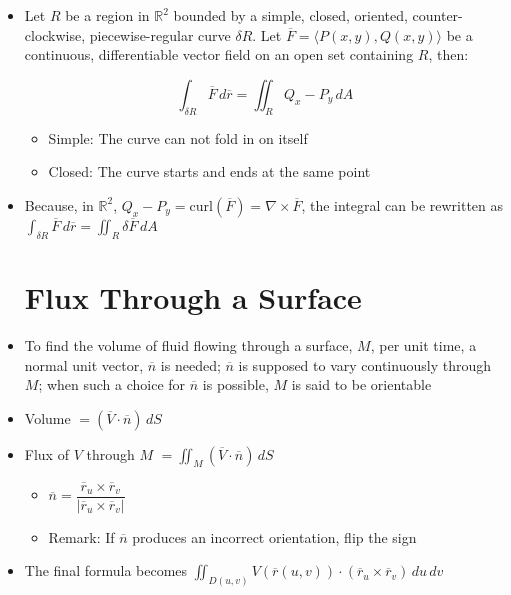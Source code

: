 \begin{itemize}
  \item Let $R$ be a region in $\mathbb{R}^2$ bounded by a simple, closed, oriented, counter-clockwise, piecewise-regular curve $\delta R$. Let $\overline{F}=\langle P(x,y), Q(x,y) \rangle$ be a continuous, differentiable vector field on an open set containing $R$, then:

    $$\int_{\delta R} \overline{F}\,d\overline{r}=\iint_R Q_x-P_y\,dA$$

    \begin{itemize}

      \item Simple: The curve can not fold in on itself

      \item Closed: The curve starts and ends at the same point

    \end{itemize}

  \item Because, in $\mathbb{R}^2$, $Q_x-P_y=\text{curl}(\overline{F})=\nabla \times \overline{F}$, the integral can be rewritten as $\displaystyle \int_{\delta R}\overline{F}\,d\overline{r}=\iint_R\delta\overline{F}\,dA$

    \section{Flux Through a Surface}

  \item To find the volume of fluid flowing through a surface, $M$, per unit time, a normal unit vector, $\overline{n}$ is needed; $\overline{n}$ is supposed to vary continuously through $M$; when such a choice for $\overline{n}$ is possible, $M$ is said to be orientable

  \item Volume $=(\overline{V}\cdot\overline{n})\,dS$

  \item Flux of $V$ through $M$ $=\displaystyle\iint_M (\overline{V}\cdot\overline{n})\,dS$

    \begin{itemize}

      \item $\overline{n}=\dfrac{\overline{r}_u\times\overline{r}_v}{|\overline{r}_u\times\overline{r}_v|}$

      \item Remark: If $\overline{n}$ produces an incorrect orientation, flip the sign

    \end{itemize}

  \item The final formula becomes $\displaystyle \iint_{D(u,v)} V(\overline{r}(u,v))\cdot (\overline{r}_u\times\overline{r}_v)\,du\,dv$

\end{itemize}




